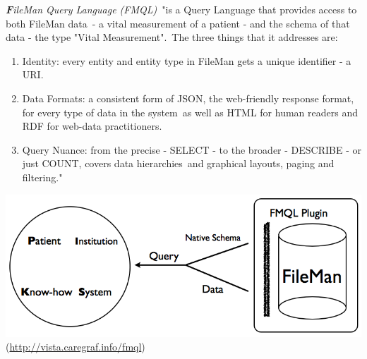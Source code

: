 \documentclass[DIV=calc, paper=a4, fontsize=12pt, onecolumn]{scrartcl}	 %
\newcommand{\initial}[1]{ %
\lettrine[lines=3,lhang=0.3,nindent=0em,slope=0em]{
\color{DarkBlue}
{\textbf{\textit{#1}}}}{}}
\begin{document}
\initial{F}\textit{ileMan Query Language (FMQL)}\
"is a Query Language that provides access to both FileMan data\
- a vital measurement of a patient - and the schema of that data - the type "Vital Measurement".\
The three things that it addresses are:
\begin{enumerate}
\item
Identity: every entity and entity type in FileMan gets a unique identifier - a URI.
\item
Data Formats: a consistent form of JSON, the web-friendly response format, for every type of data in the system\
 as well as HTML for human readers and RDF for web-data practitioners.
\item
Query Nuance: from the precise - SELECT - to the broader - DESCRIBE - or just COUNT, covers data hierarchies\
 and graphical layouts, paging and filtering."
\end{enumerate}
\includegraphics[scale=0.4]{fmqlFromFileMan.png}\\
(\url{http://vista.caregraf.info/fmql})\


  
  {}

\end{document}
